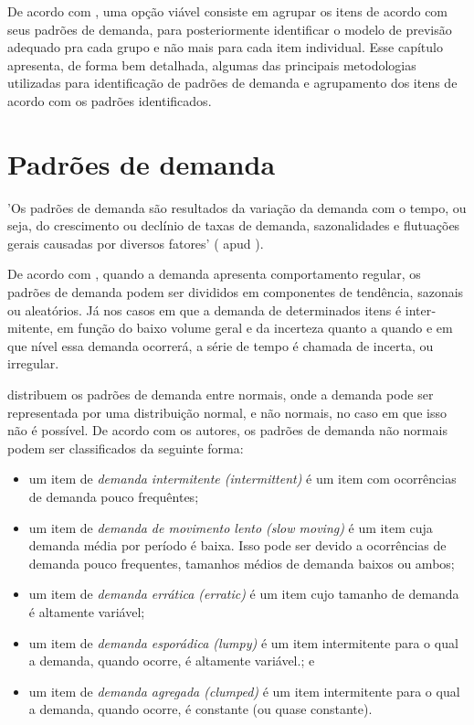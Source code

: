 \documentclass{book}
\begin{document}
De acordo com \cite{UlrichEtAl2022}, uma opção viável consiste em agrupar os itens de acordo com seus padrões de demanda, para posteriormente identificar o modelo de previsão adequado pra cada grupo e não mais para cada item individual. Esse capítulo apresenta, de forma bem detalhada, algumas das principais metodologias utilizadas para identificação de padrões de demanda e agrupamento dos itens de acordo com os padrões identificados.

\section{Padrões de demanda}

'Os padrões de demanda são resultados da variação da demanda com o tempo, ou seja, do crescimento ou declínio de taxas de demanda, sazonalidades e flutuações gerais causadas por diversos fatores' (\cite{Ballou2001} apud \cite{WernerEtAl2006}). 

De acordo com \cite{Ballou2006}, quando a demanda apresenta comportamento regular, os padrões de demanda podem ser divididos em compo­nentes de tendência, sazonais ou aleatórios. Já nos casos em que a demanda de determinados itens é inter­mitente, em função do baixo volume geral e da incerte­za quanto a quando e em que nível essa demanda ocorrerá, a série de tempo é chamada de incerta, ou irregu­lar.

\cite{BoylanEtAl2008} distribuem os padrões de demanda entre normais, onde a demanda pode ser representada por uma distribuição normal, e não normais, no caso em que isso não é possível. De acordo com os autores, os padrões de demanda não normais podem ser classificados da seguinte forma:

\begin{itemize}
  \item um item de \emph{demanda intermitente (intermittent)} é um item com ocorrências de demanda pouco frequêntes;
  \item um item de \emph{demanda de movimento lento (slow moving)} é um item cuja demanda média por período é baixa. Isso pode ser devido a ocorrências de demanda pouco frequentes, tamanhos médios de demanda baixos ou ambos;
  \item um item de \emph{demanda errática (erratic)} é um item cujo tamanho de demanda é altamente variável;
  \item um item de \emph{demanda esporádica (lumpy)} é um item intermitente para o qual a demanda, quando ocorre, é altamente variável.; e
  \item um item de \emph{demanda agregada (clumped)} é um item intermitente para o qual a demanda, quando ocorre, é constante (ou quase constante).
\end{itemize}
\end{document}
